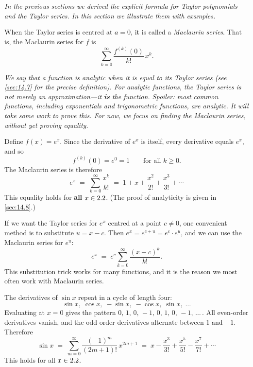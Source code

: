 \textit{In the previous sections we derived the explicit formula for Taylor polynomials and the Taylor series.  In this section we illustrate them with examples.}

\begin{definition}
\label{def:14-9}
When the Taylor series is centred at $a=0$, it is called a \emph{Maclaurin series}.  That is, the Maclaurin series for $f$ is
\[
  \sum_{k=0}^{\infty}\frac{f^{(k)}(0)}{k!}\,x^{k}.
\]
\end{definition}

\textit{We say that a function is \emph{analytic} when it is equal to its Taylor series (see \cref{sec:14.7} for the precise definition).  For analytic functions, the Taylor series is not merely an approximation---it \textbf{is} the function.  Spoiler: most common functions, including exponentials and trigonometric functions, are analytic.  It will take some work to prove this.  For now, we focus on \emph{finding} the Maclaurin series, without yet proving equality.}

\begin{example}
\label{ex:14-2}
Define $f(x)=e^{x}$.  Since the derivative of $e^{x}$ is itself, every derivative equals $e^{x}$, and so
\[
  f^{(k)}(0) = e^{0} = 1 \qquad\text{for all } k\ge 0.
\]
The Maclaurin series is therefore
\[
  e^{x} \;=\; \sum_{k=0}^{\infty}\frac{x^{k}}{k!}
  \;=\; 1 + x + \frac{x^{2}}{2!} + \frac{x^{3}}{3!} + \cdots
\]
This equality holds for \textbf{all} $x\in2.2$.  (The proof of analyticity is given in \cref{sec:14.8}.)
\end{example}

\begin{remark}
If we want the Taylor series for $e^{x}$ centred at a point $c\neq 0$, one convenient method is to substitute $u=x-c$.  Then $e^{x}=e^{c+u}=e^{c}\cdot e^{u}$, and we can use the Maclaurin series for $e^{u}$:
\[
  e^{x} \;=\; e^{c}\sum_{k=0}^{\infty}\frac{(x-c)^{k}}{k!}.
\]
This substitution trick works for many functions, and it is the reason we most often work with Maclaurin series.
\end{remark}

\begin{example}
\label{ex:14-3}
The derivatives of $\sin x$ repeat in a cycle of length four:
\[
  \sin x,\;\cos x,\;-\sin x,\;-\cos x,\;\sin x,\;\ldots
\]
Evaluating at $x=0$ gives the pattern $0,\,1,\,0,\,-1,\,0,\,1,\,0,\,-1,\,\ldots$\,.  All even-order derivatives vanish, and the odd-order derivatives alternate between $1$ and $-1$.  Therefore
\[
  \sin x \;=\; \sum_{m=0}^{\infty}\frac{(-1)^{m}}{(2m+1)!}\,x^{2m+1}
  \;=\; x - \frac{x^{3}}{3!} + \frac{x^{5}}{5!} - \frac{x^{7}}{7!} + \cdots
\]
This holds for all $x\in2.2$.
\end{example}


